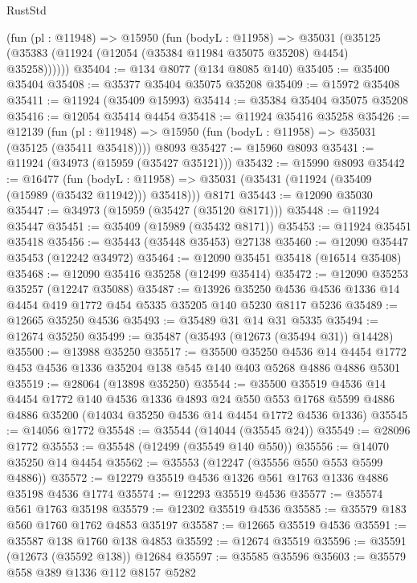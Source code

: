 \begin{lexlean}{RustStd}
\begin{coremodule}
      (fun (pl : @11948) =>
      @15950
        (fun (bodyL : @11958) =>
        @35031 (@35125 (@35383 (@11924 (@12054 (@35384 @11984 @35075 @35208) @4454) @35258))))))
@35404 := @134 @8077 (@134 @8085 @140)
@35405 := @35400 @35404
@35408 := @35377 @35404 @35075 @35208
@35409 := @15972 @35408
@35411 := @11924 (@35409 @15993)
@35414 := @35384 @35404 @35075 @35208
@35416 := @12054 @35414 @4454
@35418 := @11924 @35416 @35258
@35426 := @12139
    (fun (pl : @11948) => @15950 (fun (bodyL : @11958) => @35031 (@35125 (@35411 @35418))))
    @8093
@35427 := @15960 @8093
@35431 := @11924 (@34973 (@15959 (@35427 @35121)))
@35432 := @15990 @8093
@35442 := @16477
    (fun (bodyL : @11958) => @35031 (@35431 (@11924 (@35409 (@15989 (@35432 @11942))) @35418)))
    @8171
@35443 := @12090 @35030
@35447 := @34973 (@15959 (@35427 (@35120 @8171)))
@35448 := @11924 @35447
@35451 := @35409 (@15989 (@35432 @8171))
@35453 := @11924 @35451 @35418
@35456 := @35443 (@35448 @35453) @27138
@35460 := @12090 @35447 @35453 (@12242 @34972)
@35464 := @12090 @35451 @35418 (@16514 @35408)
@35468 := @12090 @35416 @35258 (@12499 @35414)
@35472 := @12090 @35253 @35257 (@12247 @35088)
@35487 := @13926
    @35250
    @4536
    @4536
    @1336
    @14
    @4454
    @419
    @1772
    @454
    @5335
    @35205
    @140
    @5230
    @8117
    @5236
@35489 := @12665 @35250 @4536
@35493 := @35489 @31 @14 @31 @5335
@35494 := @12674 @35250
@35499 := @35487 (@35493 (@12673 (@35494 @31)) @14428)
@35500 := @13988 @35250
@35517 := @35500
    @35250
    @4536
    @14
    @4454
    @1772
    @453
    @4536
    @1336
    @35204
    @138
    @545
    @140
    @403
    @5268
    @4886
    @4886
    @5301
@35519 := @28064 (@13898 @35250)
@35544 := @35500
    @35519
    @4536
    @14
    @4454
    @1772
    @140
    @4536
    @1336
    @4893
    @24
    @550
    @553
    @1768
    @5599
    @4886
    @4886
    @35200
    (@14034 @35250 @4536 @14 @4454 @1772 @4536 @1336)
@35545 := @14056 @1772
@35548 := @35544 (@14044 (@35545 @24))
@35549 := @28096 @1772
@35553 := @35548 (@12499 (@35549 @140 @550))
@35556 := @14070 @35250 @14 @4454
@35562 := @35553 (@12247 (@35556 @550 @553 @5599 @4886))
@35572 := @12279 @35519 @4536 @1326 @561 @1763 @1336 @4886 @35198 @4536 @1774
@35574 := @12293 @35519 @4536
@35577 := @35574 @561 @1763 @35198
@35579 := @12302 @35519 @4536
@35585 := @35579 @183 @560 @1760 @1762 @4853 @35197
@35587 := @12665 @35519 @4536
@35591 := @35587 @138 @1760 @138 @4853
@35592 := @12674 @35519
@35596 := @35591 (@12673 (@35592 @138)) @12684
@35597 := @35585 @35596
@35603 := @35579 @558 @389 @1336 @112 @8157 @5282

\end{coremodule}
\end{lexlean}
